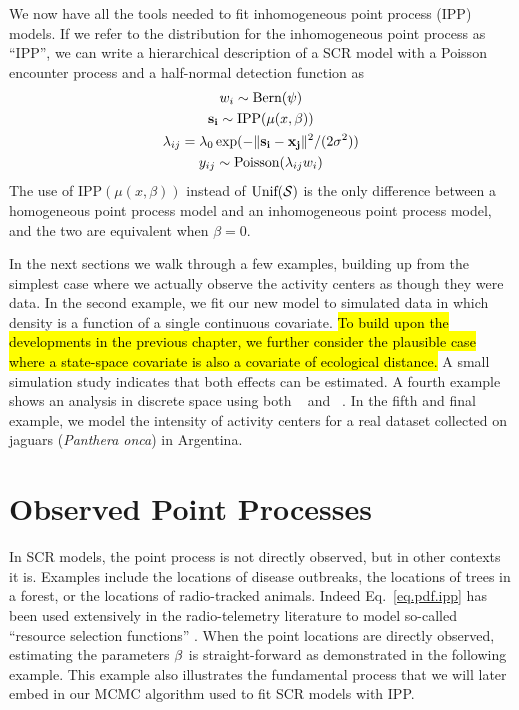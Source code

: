 We now have all the tools needed to fit inhomogeneous point process
(IPP) models. If we refer to the distribution for the
inhomogeneous point process as ``IPP'', we can write a
hierarchical description of a SCR model with a Poisson encounter process and
a half-normal detection function as
\begin{gather*}
w_i \sim \mbox{Bern}(\psi) \\
{\bf s_i} \sim \mbox{IPP}(\mu(x,\beta)) \\
\lambda_{ij} = \lambda_0 \exp(-\|{\bf s_i} - {\bf x_{j}}\|^2/(2\sigma^2)) \\
y_{ij} \sim \mbox{Poisson}(\lambda_{ij} w_i)
\end{gather*}
The use of $\mbox{IPP}(\mu(x, \beta))$ instead of
$\mbox{Unif}(\cal{S})$ is the only difference between a homogeneous
point process model and an inhomogeneous point process model, and the
two are equivalent when $\beta=0$.

In the next sections we walk through a few examples, building up from
the simplest case where we actually observe the activity centers as
though they were data. In the second example, we fit our new model to simulated
data in which density is a function of a single continuous
covariate. \hl{To build upon the developments in the previous chapter, we
further consider the plausible case where a state-space covariate is also a
covariate of ecological distance.} A small simulation study indicates
that both effects can be estimated. A fourth example shows an analysis in discrete space using
both \secr~\citep{efford:2011} and \jags~\citep{plummer:2003}. In the
fifth and final example, we model the intensity of
activity centers for a real dataset collected on jaguars
(\emph{Panthera onca}) in Argentina.

\section{Observed Point Processes}

In SCR models, the point process is not directly observed, but in
other contexts it is. Examples include the locations of disease
outbreaks, the locations of trees in a forest, or the locations of
radio-tracked animals. Indeed Eq.~\ref{eq.pdf.ipp} has been used
extensively in the radio-telemetry literature to model so-called
``resource selection functions'' \citep{manly_etal:2002,lele_keim:2006}.
When the point locations are directly observed,
estimating the parameters $\bf \beta$ is straight-forward as
demonstrated in the following example. This example also illustrates
the fundamental process that we will later embed in our MCMC algorithm
used to fit SCR models with IPP.

